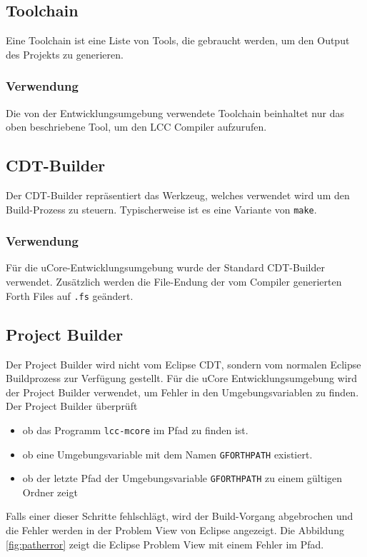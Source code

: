 \subsection{Toolchain}
Eine Toolchain ist eine Liste von Tools, die gebraucht werden, um den Output des Projekts zu generieren.\cite{managedbuildcdt} 

\subsubsection{Verwendung}
Die von der Entwicklungsumgebung verwendete Toolchain beinhaltet nur das oben beschriebene Tool, um den LCC Compiler aufzurufen.

\subsection{CDT-Builder}
Der CDT-Builder repräsentiert das Werkzeug, welches verwendet wird um den Build-Prozess zu steuern. Typischerweise ist es eine Variante von \verb!make!.\cite{managedbuildcdt} 

\subsubsection{Verwendung}
Für die uCore-Entwicklungsumgebung wurde der Standard CDT-Builder verwendet. Zusätzlich werden die File-Endung der vom Compiler generierten Forth Files auf \verb!.fs! geändert.

\subsection{Project Builder}
Der Project Builder wird nicht vom Eclipse CDT, sondern vom normalen Eclipse Buildprozess zur Verfügung gestellt. Für die uCore Entwicklungsumgebung wird der Project Builder verwendet, um Fehler in den Umgebungsvariablen zu finden. Der Project Builder überprüft
%
\begin{itemize}
  \item ob das Programm \verb!lcc-mcore! im Pfad zu finden ist.
  \item ob eine Umgebungsvariable mit dem Namen \verb!GFORTHPATH! existiert.
  \item ob der letzte Pfad der Umgebungsvariable \verb!GFORTHPATH! zu einem gültigen Ordner zeigt
\end{itemize}
%
Falls einer dieser Schritte fehlschlägt, wird der Build-Vorgang abgebrochen und die Fehler werden in der Problem View von Eclipse angezeigt. Die Abbildung \ref{fig:patherror} zeigt die Eclipse Problem View mit einem Fehler im Pfad.

